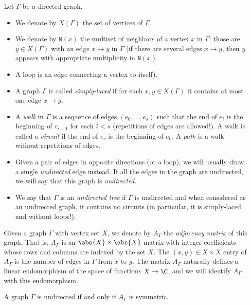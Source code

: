 \begin{nota}
 Let $\Gamma$ be a directed graph.  
 \begin{itemize}
 \item We denote by $X(\Gamma)$ the set of vertices of $\Gamma$. 
 \item We denote by $\mathtt{N}(x)$ the multiset of neighbors of a vertex $x$ in $\Gamma$: those are $y\in X(\Gamma)$ with an edge $x\to y$ in $\Gamma$ (if there are several edges $x \to y$, then $y$ appears with appropriate multiplicity in $\mathtt{N}(x)$.
 \item A loop is an edge connecting a vertex to itself). 
 \item A graph $\Gamma$ is called {\it simply-laced} if for each $x, y \in X(\Gamma)$ it contains at most one edge $x \to y$.
 \item A {\it walk} in $\Gamma$ is a sequence of edges $(e_0, \ldots, e_s)$ such that the end of $e_i$ is the beginning of $e_{i+1}$ for each $i<s$ (repetitions of edges are allowed!). A walk is called a {\it circuit} if the end of $e_s$ is the beginning of $e_{0}$. A {\it path} is a walk without repetitions of edges.
 \item Given a pair of edges in opposite directions (or a loop), we will usually draw a single {\it undirected} edge instead. If all the edges in the graph are undirected, we will say that this graph is {\it undirected}. 
 \item We say that $\Gamma$ is an {\it undirected tree} if $\Gamma$ is undirected and when considered as an undirected graph, it contains no circuits (in particular, it is simply-laced and without loops!).
 \end{itemize}
 
\end{nota}
\begin{nota}
 Given a graph $\Gamma$ with vertex set $X$, we denote by $A_{\Gamma}$ the {\it adjacency matrix} of this graph. That is, $A_{\Gamma}$ is an $\abs{X} \times \abs{X}$ matrix with integer coefficients whose rows and columns are indexed by the set $X$. The $(x,y) \in X \times X$ entry of $A_{\Gamma}$ is the number of edges in $\Gamma$ from $x$ to $y$. The matrix $A_{\Gamma}$ naturally defines a linear endomorphism of the space of functions $X \to \C$, and we will identify $A_{\Gamma}$ with this endomorphism. 
\end{nota}

\begin{rema}
 A graph $\Gamma$ is undirected if and only if $A_{\Gamma}$ is symmetric.
\end{rema}



